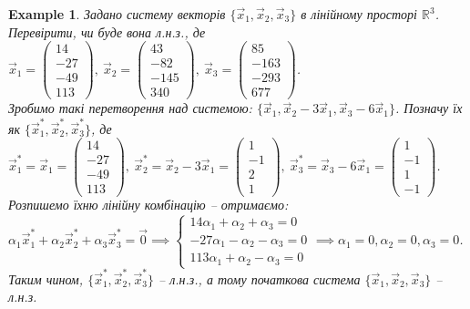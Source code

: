 \documentclass[a4paper, 10pt]{article}
\theoremstyle{theoremdd}
\newtheorem{example}[theorem]{Example}
\begin{document}
	\begin{example}
	Задано систему векторів $\{\vec{x}_1,\vec{x}_2,\vec{x}_3\}$ в лінійному просторі $\mathbb{R}^3$. Перевірити, чи буде вона л.н.з., де \\ $\vec{x}_1 = \begin{pmatrix}
	14 \\ -27 \\ -49 \\ 113
	\end{pmatrix},\ \vec{x}_2 = \begin{pmatrix}
	43 \\ -82 \\ -145 \\ 340
	\end{pmatrix},\ \vec{x}_3 = \begin{pmatrix}
	85 \\ -163 \\ -293 \\ 677
	\end{pmatrix}$.\\
	Зробимо такі перетворення над системою: $\{\vec{x}_1, \vec{x}_2 - 3 \vec{x}_1, \vec{x}_3 - 6\vec{x}_1 \}$. Позначу їх як $\{\vec{x}^*_1,\vec{x}^*_2,\vec{x}^*_3\}$, де\\
	$\vec{x}^*_1 = \vec{x}_1 = \begin{pmatrix}
	14 \\ -27 \\ -49 \\ 113
	\end{pmatrix},\ \vec{x}^*_2 = \vec{x}_2 - 3\vec{x}_1 = \begin{pmatrix}
	1 \\ -1 \\ 2 \\ 1
	\end{pmatrix},\ \vec{x}^*_3 = \vec{x}_3 - 6\vec{x}_1 = \begin{pmatrix}
	1 \\ -1 \\ 1 \\ -1
	\end{pmatrix}$.\\
	Розпишемо їхню лінійну комбінацію -- отримаємо:\\
	$\alpha_1 \vec{x}^*_1 + \alpha_2 \vec{x}^*_2 + \alpha_3 \vec{x}^*_3 = \vec{0} \implies \begin{cases} 14 \alpha_1 + \alpha_2 + \alpha_3 = 0 \\
					   -27 \alpha_1 - \alpha_2 - \alpha_3 = 0 \\
					   113 \alpha_1 + \alpha_2 - \alpha_3 = 0
	\end{cases} \implies \alpha_1 = 0, \alpha_2 = 0, \alpha_3 = 0$.\\
	Таким чином, $\{\vec{x}^*_1, \vec{x}^*_2, \vec{x}^*_3\}$ -- л.н.з., а тому початкова система $\{\vec{x}_1,\vec{x}_2,\vec{x}_3\}$ -- л.н.з.
	\end{example}
	
\end{document}
